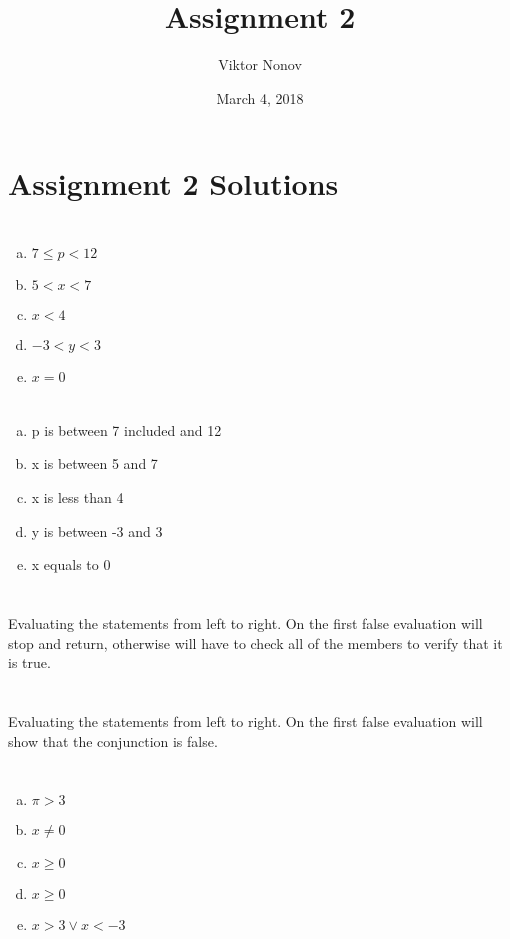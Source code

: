 \documentclass{article}
\title{Assignment 2}
\author{Viktor Nonov}
\date{March 4, 2018}
\begin{document}
\section*{Assignment 2 Solutions}

\section{}
\begin{enumerate}[a.]
\item $7 \leq p < 12$
\item $5 < x < 7$
\item $x < 4$
\item $-3 < y < 3$
\item $x = 0$
\end{enumerate}

\section{}
\begin{enumerate}[a.]
\item p is between 7 included and 12
\item x is between 5 and 7
\item x is less than 4
\item y is between -3 and 3
\item x equals to 0
\end{enumerate}

\section{}
Evaluating the statements from left to right. On the first false evaluation will stop and return, otherwise will have to check all of the members to verify that it is true.

\section{}
Evaluating the statements from left to right. On the first false evaluation will show that the conjunction is false.

\section{}
\begin{enumerate}[a.]
\item $\pi > 3$
\item $x \neq 0$
\item $x \geq 0$
\item $x \geq 0$
\item $x > 3 \vee x < -3$
\end{enumerate}
\end{document}
